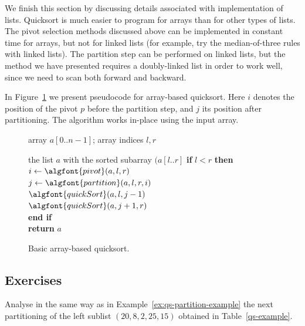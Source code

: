 We finish this section by discussing details associated with implementation of 
lists. Quicksort is much easier to program for arrays than for other types of 
lists. The pivot selection methods discussed above can be implemented in constant
time for arrays, but not for linked lists (for example, try the median-of-three 
rules with linked lists). The partition step can be performed on linked lists, 
but the method we have presented requires a doubly-linked list in order to work 
well, since we need to scan both forward and backward. 

In Figure~\ref{fig:quicksort} we present pseudocode for array-based quicksort. 
Here $i$ denotes the position of the pivot $p$ before the partition step, 
and $j$ its position after partitioning. The algorithm works in-place using the 
input array.

\begin{figure}[htb!]
\hspace*{.5in}\begin{minipage}{5in}
{
\begin{minipage}[t]{5in}
array $a[0..n-1]$; array indices $l, r$\\
\end{minipage}
}
{the list $a$ with the sorted subarray $(a[l..r]$}
{
\> \textbf{if} $l < r$ \textbf{then} \\
\> \> $i \leftarrow \algfont{pivot}(a,l,r)$ \\
\> \> $j \leftarrow \algfont{partition}(a,l,r,i)$ \\
\> \>$\algfont{quickSort}(a, l, j - 1)$   \\
\> \>$\algfont{quickSort}(a, j+1, r)$    \\
\> \textbf{end if}\\
\> \textbf{return} $a$\\
}
\end{minipage}
\caption{\label{fig:quicksort} Basic array-based quicksort.}
\end{figure} 

\subsection*{Exercises}

\begin{Exercise}\label{exr:qs-example}
Analyse in the same way as in Example~\ref{ex:qs-partition-example}
the next partitioning of the  left sublist 
$(20, 8, 2, 25, 15)$ obtained in Table~\ref{qs-example}.
\end{Exercise}

